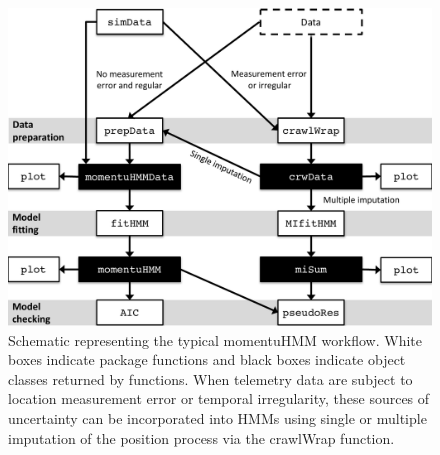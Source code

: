 \documentclass[12pt]{article}\usepackage[]{graphicx}\usepackage[]{color}
\begin{document}
\begin{figure}[htbp]
  \centering
  \includegraphics[width=\textwidth]{workflow_simData.pdf}
  \caption{Schematic representing the typical momentuHMM workflow. White boxes indicate package functions and black boxes indicate object classes returned by functions. When telemetry data are subject to location measurement error or temporal irregularity, these sources of uncertainty can be incorporated into HMMs using single or multiple imputation of the position process via the crawlWrap function.}
  \label{fig:workflow}
\end{figure}
\end{document}

